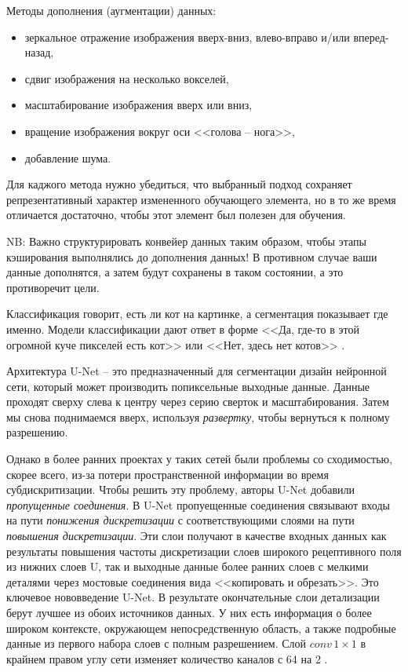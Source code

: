 \documentclass[%
	11pt,
	a4paper,
	utf8,
		]{article}
\begin{document}
Методы дополнения (аугментации) данных:
\begin{itemize}
	\item зеркальное отражение изображения вверх-вниз, влево-вправо и/или вперед-назад,
	
	\item сдвиг изображения на несколько вокселей,
	
    \item масштабирование изображения вверх или вниз,
    
    \item вращение изображения вокруг оси <<голова -- нога>>,
    
    \item добавление шума.
\end{itemize}

Для каджого метода нужно убедиться, что выбранный подход сохраняет репрезентативный характер измененного обучающего элемента, но в то же время отличается достаточно, чтобы этот элемент был полезен для обучения.

NB: Важно структурировать конвейер данных таким образом, чтобы этапы кэширования выполнялись до дополнения данных! В противном случае ваши данные дополнятся, а затем будут сохранены в таком состоянии, а это противоречит цели.

Классификация говорит, есть ли кот на картинке, а сегментация показывает где именно. Модели классификации дают ответ в форме <<Да, где-то в этой огромной куче пикселей есть кот>> или <<Нет, здесь нет котов>> \cite[]{pytorch-2022}.

Архитектура U-Net -- это предназначенный для сегментации дизайн нейронной сети, который может производить попиксельные выходные данные. Данные проходят сверху слева к центру через серию сверток и масштабирования. Затем мы снова поднимаемся вверх, используя \emph{развертку}, чтобы вернуться к полному разрешению.

Однако в более ранних проектах у таких сетей были проблемы со сходимостью, скорее всего, из-за потери пространственной информации во время субдискритизации. Чтобы решить эту проблему, авторы U-Net добавили \emph{пропущенные соединения}. В U-Net пропуещенные соединения связывают входы на пути \emph{понижения дискретизации} с соответствующими слоями на пути \emph{повышения дискретизации}. Эти слои получают в качестве входных данных как результаты повышения частоты дискретизации слоев широкого рецептивного поля из нижних слоев U, так и выходные данные более ранних слоев с мелкими деталями через мостовые соединения вида <<копировать и обрезать>>. Это ключевое нововведение U-Net. В результате окончательные слои детализации берут лучшее из обоих источников данных. У них есть информация о более широком контексте, окружающем непосредственную область, а также подробные данные из первого набора слоев с полным разрешением. Слой $conv \, 1 \times 1$ в крайнем правом углу сети изменяет количество каналов с 64 на 2 \cite[]{pytorch-2022}.
\end{document}
